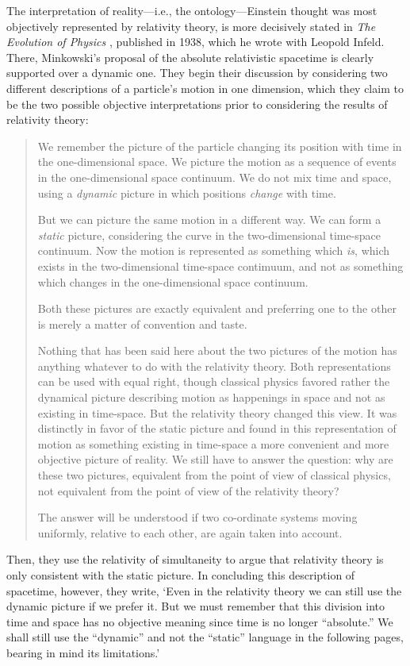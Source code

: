 The interpretation of reality---i.e., the ontology---Einstein thought was most objectively represented by relativity theory, is more decisively stated in \textit{The Evolution of Physics} \cite{Einstein1938}, published in 1938, which he wrote with Leopold Infeld. There, Minkowski's proposal of the absolute relativistic spacetime is clearly supported over a dynamic one. They begin their discussion by considering two different descriptions of a particle's motion in one dimension, which they claim to be the two possible objective interpretations prior to considering the results of relativity theory:
\begin{quotation}
We remember the picture of the particle changing its position with time in the one-dimensional space. We picture the motion as a sequence of events in the one-dimensional space continuum. We do not mix time and space, using a \textit{dynamic} picture in which positions \textit{change} with time.

But we can picture the same motion in a different way. We can form a \textit{static} picture, considering the curve in the two-dimensional time-space continuum. Now the motion is represented as something which \textit{is}, which exists in the two-dimensional time-space contimuum, and not as something which changes in the one-dimensional space continuum.

Both these pictures are exactly equivalent and preferring one to the other is merely a matter of convention and taste.

Nothing that has been said here about the two pictures of the motion has anything whatever to do with the relativity theory. Both representations can be used with equal right, though classical physics favored rather the dynamical picture describing motion as happenings in space and not as existing in time-space. But the relativity theory changed this view. It was distinctly in favor of the static picture and found in this representation of motion as something existing in time-space a more convenient and more objective picture of reality. We still have to answer the question: why are these two pictures, equivalent from the point of view of classical physics, not equivalent from the point of view of the relativity theory?

The answer will be understood if two co-ordinate systems moving uniformly, relative to each other, are again taken into account.
\end{quotation}
Then, they use the relativity of simultaneity to argue that relativity theory is only consistent with the static picture. In concluding this description of spacetime, however, they write, `Even in the relativity theory we can still use the dynamic picture if we prefer it. But we must remember that this division into time and space has no objective meaning since time is no longer ``absolute.'' We shall still use the ``dynamic'' and not the ``static'' language in the following pages, bearing in mind its limitations.'

